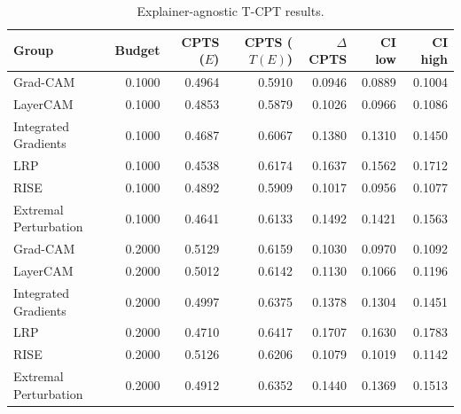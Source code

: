 \begin{table}[t]
\caption{Explainer-agnostic T-CPT results.}
\label{tab:tcpt_explainer}
\begin{tabular}{lrrrrrr}
\toprule
Group & Budget & CPTS ($E$) & CPTS ($T(E)$) & $\Delta$CPTS & CI low & CI high \\
\midrule
Grad-CAM & 0.1000 & 0.4964 & 0.5910 & 0.0946 & 0.0889 & 0.1004 \\
LayerCAM & 0.1000 & 0.4853 & 0.5879 & 0.1026 & 0.0966 & 0.1086 \\
Integrated Gradients & 0.1000 & 0.4687 & 0.6067 & 0.1380 & 0.1310 & 0.1450 \\
LRP & 0.1000 & 0.4538 & 0.6174 & 0.1637 & 0.1562 & 0.1712 \\
RISE & 0.1000 & 0.4892 & 0.5909 & 0.1017 & 0.0956 & 0.1077 \\
Extremal Perturbation & 0.1000 & 0.4641 & 0.6133 & 0.1492 & 0.1421 & 0.1563 \\
Grad-CAM & 0.2000 & 0.5129 & 0.6159 & 0.1030 & 0.0970 & 0.1092 \\
LayerCAM & 0.2000 & 0.5012 & 0.6142 & 0.1130 & 0.1066 & 0.1196 \\
Integrated Gradients & 0.2000 & 0.4997 & 0.6375 & 0.1378 & 0.1304 & 0.1451 \\
LRP & 0.2000 & 0.4710 & 0.6417 & 0.1707 & 0.1630 & 0.1783 \\
RISE & 0.2000 & 0.5126 & 0.6206 & 0.1079 & 0.1019 & 0.1142 \\
Extremal Perturbation & 0.2000 & 0.4912 & 0.6352 & 0.1440 & 0.1369 & 0.1513 \\
\bottomrule
\end{tabular}
\end{table}
